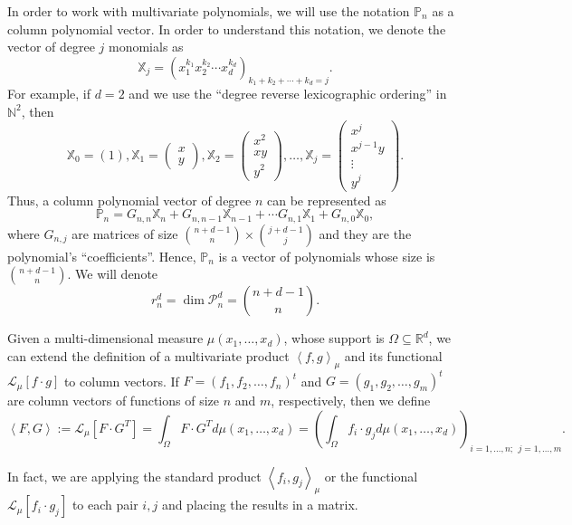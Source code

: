 \documentclass[12pt,a4]{article}
\theoremstyle{plain}
\newcommand{\R}[0]{\mathbb{R}}
\newcommand{\N}[0]{\mathbb{N}}
\newcommand{\prodesc}[2]{\left\langle #1 , #2 \right\rangle}
\begin{document}
In order to work with multivariate polynomials, we will use the notation $\mathbb P_n$ as a column polynomial vector. In order to understand this notation, we denote the vector of degree $j$ monomials as
$$
\mathbb{X}_j = \left(x_1^{k_1} x_2^{k_2} \cdots x_d^{k_d}\right)_{k_1+k_2+\cdots +k_d = j}.
$$
For example, if $d=2$ and we use the ``degree reverse lexicographic ordering'' in $\N^2$, then
$$
\mathbb{X}_0=\left(1\right), \mathbb{X}_1=\begin{pmatrix}
    x \\ y
\end{pmatrix}, \mathbb{X}_2=\begin{pmatrix}
    x^2 \\ xy \\ y^2
\end{pmatrix}, \dots, \mathbb{X}_j=\begin{pmatrix}
    x^j \\ x^{j-1}y \\ \vdots \\ y^j
\end{pmatrix}.
$$
Thus, a column polynomial vector of degree $n$ can be represented as
$$
\mathbb{P}_n = G_{n,n}\mathbb{X}_n + G_{n,n-1}\mathbb{X}_{n-1}+\cdots G_{n,1}\mathbb{X}_1 + G_{n,0}\mathbb X_0,
$$
where $G_{n,j}$ are matrices of size $\binom{n+d-1}{n}\times\binom{j+d-1}{j}$ and they are the polynomial's ``coefficients''. Hence, $\mathbb P_n$ is a vector of polynomials whose size is $\binom{n+d-1}{n}$. We will denote 
$$
r_n^d = \dim \mathcal{P}_n^d = \binom{n+d-1}{n}.
$$

Given a multi-dimensional measure $\mu(x_1,\dots,x_d)$, whose support is $\Omega\subseteq\R^d$, we can extend the definition of a multivariate product $\prodesc{f}{g}_\mu$ and its functional $\mathcal{L}_\mu[f\cdot g]$ to column vectors. If $F=(f_1,f_2,\dots,f_n)^t$ and $G=(g_1,g_2,\dots, g_m)^t$ are column vectors of functions of size $n$ and $m$, respectively, then we define
\begin{equation}
    \label{eq:prodesc-matrix}
    \prodesc{F}{G}:=\mathcal{L}_\mu[F\cdot G^T] = \int_\Omega F\cdot G^T d\mu(x_1,\dots,x_d) = \left(\int_\Omega f_i\cdot g_j d\mu(x_1,\dots,x_d)\right)_{i=1,\dots,n;\ \ j = 1,\dots, m}.
\end{equation}

In fact, we are applying the standard product $\prodesc{f_i}{g_j}_\mu$ or the functional $\mathcal L_\mu[f_i\cdot g_j]$ to each pair $i,j$ and placing the results in a matrix.
\end{document}
